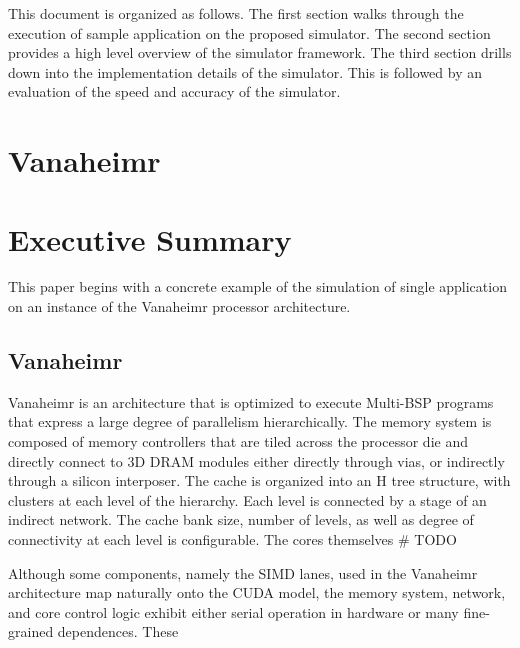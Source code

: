 \documentclass[conference, 10pt]{IEEEtran}
\begin{document}
This document is organized as follows.  The first section walks through the
execution of sample application on the proposed simulator.  The second section
provides a high level overview of the simulator framework.  The third section
drills down into the implementation details of the simulator.  This is followed
by an evaluation of the speed and accuracy of the simulator.


\section{Vanaheimr}
\label{sec:}



\section{Executive Summary}

This paper begins with a concrete example of the simulation of single
application on an instance of the Vanaheimr processor architecture.  

\subsection{Vanaheimr}

Vanaheimr is an architecture that is optimized to execute Multi-BSP programs
that express a large degree of parallelism hierarchically.  The memory system
is composed of memory controllers that are tiled across the processor die
and directly connect to 3D DRAM modules either directly through vias, or
indirectly through a silicon interposer.  The cache is organized
into an H tree structure, with clusters at each level of the hierarchy.  Each
level is connected by a stage of an indirect network.  The cache bank size,
number of levels, as well as degree of connectivity at each level is
configurable.  The cores themselves # TODO

Although some components, namely the SIMD lanes, used in the Vanaheimr
architecture map naturally onto the CUDA model, the memory system, network,
and core control logic exhibit either serial operation in hardware or many
fine-grained dependences.  These 
\end{document}
